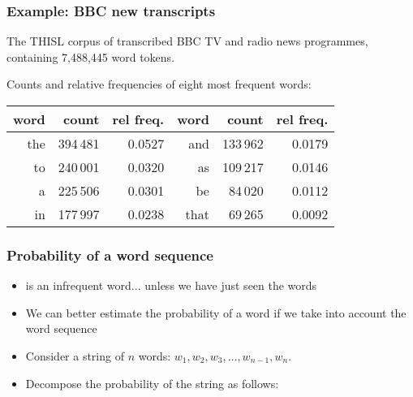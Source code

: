\begin{frame}
  \frametitle{Example: BBC new transcripts}
  The THISL corpus of transcribed BBC TV and radio news programmes,
  containing 7,488,445 word tokens.

  Counts and relative frequencies of eight most frequent words:

  \medskip
  \begin{center}
  \begin{tabular}{|r|r|r||r|r|r|}
    \hline
    word & count & rel freq. & word & count & rel freq. \\
    \hline
    \hline
    the & 394\,481 & 0.0527 & and & 133\,962 & 0.0179 \\ 
    \hline 
    to & 240\,001 & 0.0320 & as & 109\,217 & 0.0146 \\
    \hline
    a & 225\,506 & 0.0301 & be & 84\,020 & 0.0112 \\
    \hline
    in & 177\,997 & 0.0238 & that & 69\,265 & 0.0092 \\
    \hline
  \end{tabular}
  \end{center}
\end{frame}

\begin{frame}
  \frametitle{Probability of a word sequence}
  \begin{itemize}
  \item<1->  is an infrequent word... unless
    we have just seen the words 
  \item<2-> We can better estimate the probability of a word if we take
    into account the word sequence
  \item<3-> Consider a string of $n$ words:
    $w_1,w_2,w_3,\ldots,w_{n-1},w_n$.
  \item<3-> Decompose the probability of the string as follows:
  \end{itemize}
\end{frame}

